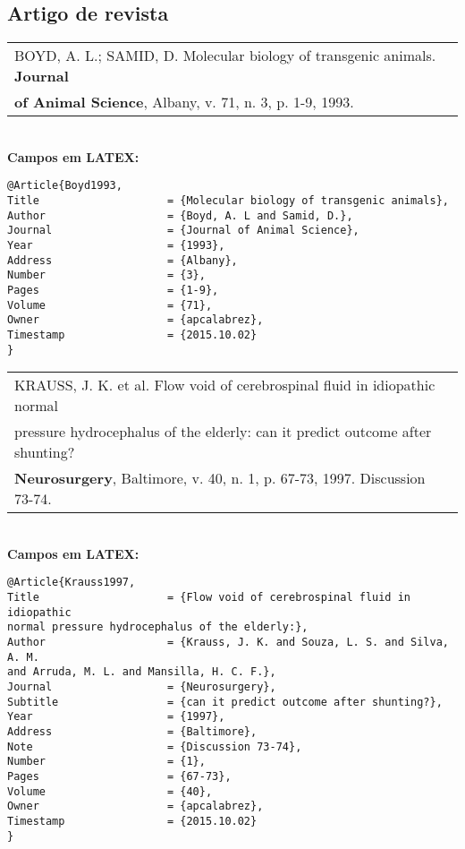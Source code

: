\subsection{Artigo de revista}


\begin{tabular}{|l|c|} \hline
BOYD, A. L.; SAMID, D. Molecular biology of transgenic animals. \textbf{Journal } \\ \textbf{of  Animal Science}, Albany, v. 71, n. 3, p. 1-9, 1993.
	\\\hline
\end{tabular} \\

\textbf{Campos em LATEX:} 

\begin{verbatim}
@Article{Boyd1993,
Title                    = {Molecular biology of transgenic animals},
Author                   = {Boyd, A. L and Samid, D.},
Journal                  = {Journal of Animal Science},
Year                     = {1993},
Address                  = {Albany},
Number                   = {3},
Pages                    = {1-9},
Volume                   = {71},
Owner                    = {apcalabrez},
Timestamp                = {2015.10.02}
}
\end{verbatim}

\begin{tabular}{|l|c|} \hline
KRAUSS, J. K. et al. Flow void of cerebrospinal fluid in idiopathic normal\\
pressure hydrocephalus of the elderly: can it predict outcome after
shunting? \\\textbf{Neurosurgery}, Baltimore, v. 40, n. 1, p. 67-73, 1997.
Discussion 73-74. 
	\\\hline
\end{tabular} \\

\textbf{Campos em LATEX:} 

\begin{verbatim}
@Article{Krauss1997,
Title                    = {Flow void of cerebrospinal fluid in idiopathic 
normal pressure hydrocephalus of the elderly:},
Author                   = {Krauss, J. K. and Souza, L. S. and Silva, A. M. 
and Arruda, M. L. and Mansilla, H. C. F.},
Journal                  = {Neurosurgery},
Subtitle                 = {can it predict outcome after shunting?},
Year                     = {1997},
Address                  = {Baltimore},
Note                     = {Discussion 73-74},
Number                   = {1},
Pages                    = {67-73},
Volume                   = {40},
Owner                    = {apcalabrez},
Timestamp                = {2015.10.02}
}
\end{verbatim}

